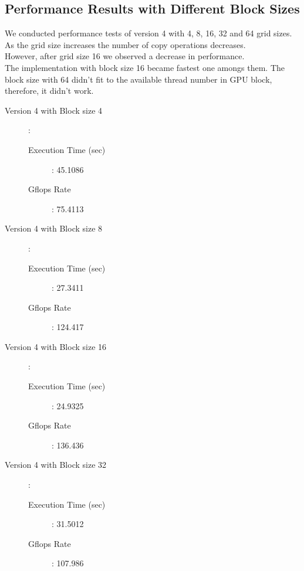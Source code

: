 \documentclass{article}
\newcommand\tab[1][0.5cm]{\hspace*{#1}}
\begin{document}
\subsection{Performance Results with Different Block Sizes}
\tab We conducted performance tests of version 4 with 4, 8, 16, 32 and 64 grid sizes. As the grid size increases the number of copy operations decreases. \\However, after grid size 16 we observed a decrease in performance. 
\\ \tab The implementation with block size 16 became fastest one amongs them. The block size with 64 didn't fit to the available thread number in GPU block, therefore, it didn't work.  
\begin{description}
  \item[Version 4 with Block size 4]: \hfill
    \begin{description} 
      \item[Execution Time (sec)]: 45.1086\hfill 
      \item[Gflops Rate]: 75.4113\hfill 
    \end{description}  
  \item[Version 4 with Block size 8]: \hfill
    \begin{description} 
      \item[Execution Time (sec)]: 27.3411\hfill 
      \item[Gflops Rate ]: 124.417\hfill 
    \end{description}
  \item[Version 4 with Block size 16]: \hfill
    \begin{description} 
      \item[Execution Time (sec)]: 24.9325\hfill 
      \item[Gflops Rate]: 136.436\hfill 
    \end{description}
  \item[Version 4 with Block size 32]: \hfill
    \begin{description} 
      \item[Execution Time (sec)]: 31.5012\hfill 
      \item[Gflops Rate]: 107.986\hfill 
    \end{description}      
\end{description}
\end{document}
